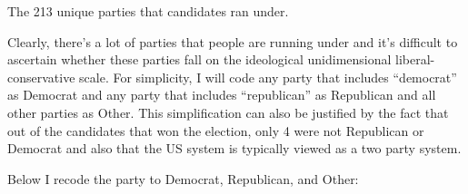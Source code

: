 \documentclass[]{article}
\newenvironment{Shaded}{\begin{snugshade}}{\end{snugshade}}
\newcommand{\KeywordTok}[1]{\textcolor[rgb]{0.13,0.29,0.53}{\textbf{#1}}}
\newcommand{\StringTok}[1]{\textcolor[rgb]{0.31,0.60,0.02}{#1}}
\newcommand{\OperatorTok}[1]{\textcolor[rgb]{0.81,0.36,0.00}{\textbf{#1}}}
\newcommand{\NormalTok}[1]{#1}
\begin{document}
\begin{Shaded}
\end{Shaded}

The 213 unique parties that candidates ran under.

Clearly, there's a lot of parties that people are running under and it's
difficult to ascertain whether these parties fall on the ideological
unidimensional liberal-conservative scale. For simplicity, I will code
any party that includes ``democrat'' as Democrat and any party that
includes ``republican'' as Republican and all other parties as Other.
This simplification can also be justified by the fact that out of the
candidates that won the election, only 4 were not Republican or Democrat
and also that the US system is typically viewed as a two party system.

Below I recode the party to Democrat, Republican, and Other:
\end{document}
